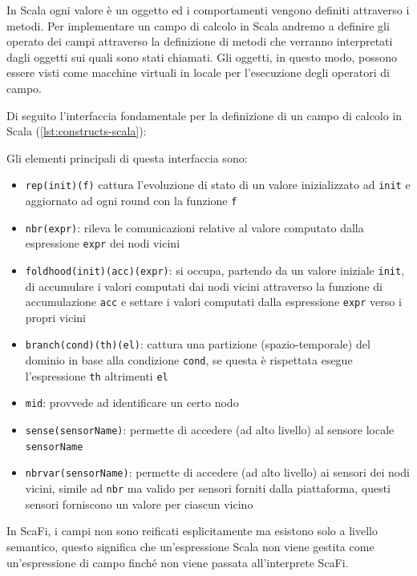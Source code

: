 \documentclass[12pt,a4paper,openright,twoside]{book}
\begin{document}
In Scala ogni valore è un oggetto ed i comportamenti vengono definiti attraverso i metodi. Per implementare un campo di calcolo in Scala andremo a definire gli operato dei campi attraverso la definizione di metodi che verranno interpretati dagli oggetti sui quali sono stati chiamati. Gli oggetti, in questo modo, possono essere visti come macchine virtuali in locale per l'esecuzione degli operatori di campo.

Di seguito l'interfaccia fondamentale per la definizione di un campo di calcolo in Scala (\cref{lst:constructs-scala}):



Gli elementi principali di questa interfaccia sono:
\begin{itemize}
    \item \verb|rep(init)(f)| cattura l'evoluzione di stato di un valore inizializzato ad \verb|init| e aggiornato ad ogni round con la funzione \verb|f|
    \item \verb|nbr(expr)|: rileva le comunicazioni relative al valore computato dalla espressione \verb|expr| dei nodi vicini
    \item \verb|foldhood(init)(acc)(expr)|: si occupa, partendo da un valore iniziale \verb|init|, di accumulare i valori computati dai nodi vicini attraverso la funzione di accumulazione \verb|acc| e settare i valori computati dalla espressione \verb|expr| verso i propri vicini
    \item \verb|branch(cond)(th)(el)|: cattura una partizione (spazio-temporale) del dominio in base alla condizione \verb|cond|, se questa è rispettata esegue l'espressione \verb|th| altrimenti \verb|el|
    \item \verb|mid|: provvede ad identificare un certo nodo
    \item \verb|sense(sensorName)|: permette di accedere (ad alto livello) al sensore locale \verb|sensorName|
    \item \verb|nbrvar(sensorName)|: permette di accedere (ad alto livello) ai sensori dei nodi vicini, simile ad \verb|nbr| ma valido per sensori forniti dalla piattaforma, questi sensori forniscono un valore per ciascun vicino
\end{itemize}

In ScaFi, i campi non sono reificati esplicitamente ma esistono solo a livello semantico, questo significa che un'espressione Scala non viene gestita come un'espressione di campo finché non viene passata all'interprete ScaFi.
\end{document}
